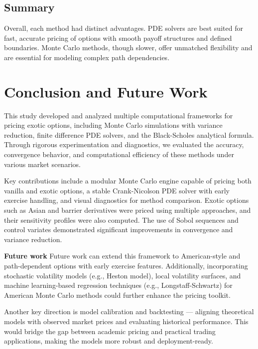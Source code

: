 \documentclass[12pt,a4paper]{article}
\begin{document}
\subsection{Summary}
Overall, each method had distinct advantages. PDE solvers are best suited for fast, accurate pricing of options with smooth payoff structures and defined boundaries. Monte Carlo methods, though slower, offer unmatched flexibility and are essential for modeling complex path dependencies.
\newpage

\section{Conclusion and Future Work}

This study developed and analyzed multiple computational frameworks for pricing exotic options, including Monte Carlo simulations with variance reduction, finite difference PDE solvers, and the Black-Scholes analytical formula. Through rigorous experimentation and diagnostics, we evaluated the accuracy, convergence behavior, and computational efficiency of these methods under various market scenarios.

Key contributions include a modular Monte Carlo engine capable of pricing both vanilla and exotic options, a stable Crank-Nicolson PDE solver with early exercise handling, and visual diagnostics for method comparison. Exotic options such as Asian and barrier derivatives were priced using multiple approaches, and their sensitivity profiles were also computed. The use of Sobol sequences and control variates demonstrated significant improvements in convergence and variance reduction.

\textbf{Future work} Future work can extend this framework to American-style and path-dependent options with early exercise features. Additionally, incorporating stochastic volatility models (e.g., Heston model), local volatility surfaces, and machine learning-based regression techniques (e.g., Longstaff-Schwartz) for American Monte Carlo methods could further enhance the pricing toolkit. 

Another key direction is model calibration and backtesting — aligning theoretical models with observed market prices and evaluating historical performance. This would bridge the gap between academic pricing and practical trading applications, making the models more robust and deployment-ready.




\newpage
\end{document}
